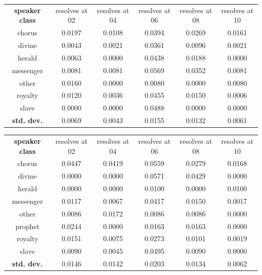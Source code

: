 \documentclass[
]{ceurart}
\begin{document}
\begin{center}
\label{fig:aeschylus-rel-freq}

\end{center}

\begin{center}
\begin{tabular}{c | c | c | c | c | c} \\
\textbf{speaker class} & resolves at 02 & resolves at 04 & resolves at 06 & resolves at 08 & resolves at 10 \\
chorus & 0.0197 & 0.0108 & 0.0394 & 0.0269 & 0.0161 \\
divine & 0.0043 & 0.0021 & 0.0361 & 0.0096 & 0.0021 \\
herald & 0.0063 & 0.0000 & 0.0438 & 0.0188 & 0.0000 \\
messenger & 0.0081 & 0.0081 & 0.0569 & 0.0352 & 0.0081 \\
other & 0.0160 & 0.0000 & 0.0080 & 0.0000 & 0.0080 \\
royalty & 0.0120 & 0.0036 & 0.0455 & 0.0150 & 0.0006 \\
slave & 0.0000 & 0.0000 & 0.0488 & 0.0000 & 0.0000 \\
\textbf{std. dev.} & 0.0069 & 0.0043 & 0.0155 & 0.0132 & 0.0061 \\
\end{tabular}
\end{center}

\begin{center}
\label{fig:sophocles-rel-freq}

\end{center}

\begin{center}
\begin{tabular}{c | c | c | c | c | c} \\
\textbf{speaker class} & resolves at 02 & resolves at 04 & resolves at 06 & resolves at 08 & resolves at 10 \\
chorus & 0.0447 & 0.0419 & 0.0559 & 0.0279 & 0.0168 \\
divine & 0.0000 & 0.0000 & 0.0571 & 0.0429 & 0.0000 \\
herald & 0.0000 & 0.0000 & 0.0100 & 0.0000 & 0.0100 \\
messenger & 0.0117 & 0.0067 & 0.0417 & 0.0150 & 0.0017 \\
other & 0.0086 & 0.0172 & 0.0086 & 0.0086 & 0.0000 \\
prophet & 0.0244 & 0.0000 & 0.0163 & 0.0163 & 0.0000 \\
royalty & 0.0151 & 0.0075 & 0.0273 & 0.0101 & 0.0019 \\
slave & 0.0090 & 0.0045 & 0.0495 & 0.0090 & 0.0000 \\
\textbf{std. dev.} & 0.0146 & 0.0142 & 0.0203 & 0.0134 & 0.0062 \\
\end{tabular}
\end{center}
\end{document}
